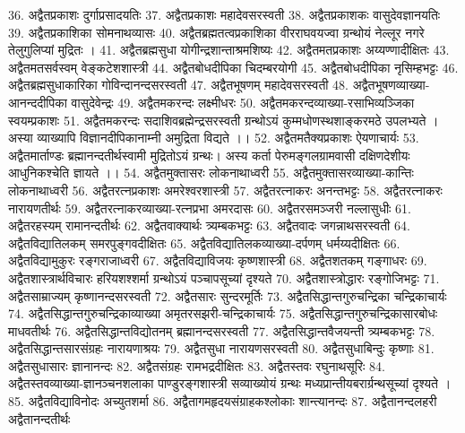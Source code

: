 36. अद्वैतप्रकाशः						दुर्गाप्रसादयतिः 
37. अद्वैतप्रकाशः 						महादेवसरस्वती
38. अद्वैतप्रकाशकः						वासुदेवज्ञानयतिः
39. अद्वैतप्रकाशिका						सोमनाथव्यासः
40. अद्वैतब्रह्मतत्वप्रकाशिका				वीरराघवयज्वा
	  ग्रन्थोयं नेल्लूर नगरे तेलुगुलिप्यां मुद्रितः । 
41. अद्वैतब्रह्मसुधा						योगीन्द्रशान्ताश्रमशिष्यः
42. अद्वैतमतप्रकाशः						अय्यण्णादीक्षितः
43. अद्वैतमतसर्वस्वम् 					वेङ्कटेशशास्त्री 
44. अद्वैतबोधदीपिका					चिदम्बरयोगी
45. अद्वैतबोधदीपिका					नृसिम्हभट्टः
46. अद्वैतब्रह्मसुधाकारिका 				गोविन्दानन्दसरस्वती 
47. अद्वैतभूषणम्							महादेवसरस्वती
48. अद्वैतभूषणव्याख्या-आनन्ददीपिका वासुदेवेन्द्रः
49. अद्वैतमकरन्दः						लक्ष्मीधरः
50. अद्वैतमकरन्दव्याख्या-रसाभिव्यञ्जिका स्वयम्प्रकाशः
51. अद्वैतमकरन्दः 						सदाशिवब्रह्मेन्द्रसरस्वती
	 ग्रन्थोऽयं कुम्मधोणस्थशाङ्करमठे उपलभ्यते । अस्या व्याख्यापि विज्ञानदीपिकानाम्नी अमुद्रिता विद्यते ।।
52. अद्वैतमतैक्यप्रकाशः 				ऐयणाचार्यः
53. अद्वैतमार्ताण्डः 						ब्रह्मानन्दतीर्थस्वामी 
	 मुद्रितोऽयं ग्रन्थः। अस्य कर्ता पेरुमङ्गलग्रामवासी दक्षिणदेशीयः आधुनिकश्चेति ज्ञायते ।। 
54. अद्वैतमुक्तासरः 						लोकनाथाध्वरी
55. अद्वैतमुक्तासरव्याख्या-कान्तिः		लोकनाथाध्वरी
56. अद्वैतरत्नप्रकाशः					अमरेश्वरशास्त्री
57. अद्वैतरत्नाकरः 						अनन्तभट्टः
58. अद्वैतरत्नाकरः						नारायणतीर्थः
59. अद्वैतरत्नाकरव्याख्या-रत्नप्रभा	अमरदासः
60. अद्वैतरसमञ्जरी 						नल्लासुधीः
61. अद्वैतरहस्यम् 						रामानन्दतीर्थः
62. अद्वैतवाक्यार्थः						त्र्यम्बकभट्टः
63. अद्वैतवादः							जगन्नाथसरस्वती
64. अद्वैतविद्यातिलकम् 					समरपुङ्गवदीक्षितः 
65. अद्वैतविद्यातिलकव्याख्या-दर्पणम्	धर्मय्यदीक्षितः  
66. अद्वैतविद्यामुकुरः					रङ्गराजाध्वरी
67. अद्वैतविद्याविजयः 					कृष्णशास्त्री
68. अद्वैतशतकम्						गङ्गाधरः
69. अद्वैतशास्त्रार्थविचारः 				हरियशश्शर्मा
	  ग्रन्थोऽयं पञ्चापसूच्यां दृश्यते 
70. अद्वैतशास्त्रोद्धारः						रङ्गोजिभट्टः
71. अद्वैतसाम्राज्यम्						कृष्णानन्दसरस्वती
72. अद्वैतसारः 							सुन्दरमूर्तिः
73. अद्वैतसिद्धान्तगुरुचन्द्रिका 			चन्द्रिकाचार्यः 
74. अद्वैतसिद्धान्तगुरुचन्द्रिकाव्याख्या 	अमृतरसझरी-चन्द्रिकाचार्यः
75. अद्वैतसिद्धान्तगुरुचन्द्रिकासारबोधः माधवतीर्थः
76. अद्वैतसिद्धान्तविद्योतनम् 			ब्रह्मानन्दसरस्वती
77. अद्वैतसिद्धान्तवैजयन्ती				त्र्यम्बकभट्टः	
78. अद्वैतसिद्धान्तसारसंग्रहः				नारायणाश्रयः
79. अद्वैतसुधा							नारायणसरस्वती
80. अद्वैतसुधाबिन्दुः 					कृष्णाः
81. अद्वैतसुधासारः 						ज्ञानानन्दः
82. अद्वैतसंग्रहः							रामभद्रदीक्षितः 
83. अद्वैतस्तवः 							रघुनाथसूरिः
84. अद्वैतस्तवव्याख्या-ज्ञानञ्चनशलाका पाण्डुरङ्गशास्त्री
	  सव्याख्योयं ग्रन्थः मध्यप्रान्तीयबरार्ग्रन्थसूच्यां दृश्यते ।
85. अद्वैतविद्याविनोदः 					अच्युतशर्मा
86. अद्वैतागमहृदयसंग्राहकश्लोकाः 		शान्त्यानन्दः
87. अद्वैतानन्दलहरी						अद्वैतानन्दतीर्थः
